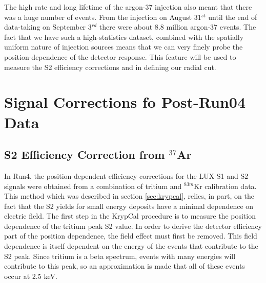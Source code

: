 The high rate and long lifetime of the argon-37 injection also meant that there was a huge number of events. From the injection on August 31$^{st}$ until the end of data-taking on September 3$^{rd}$ there were about 8.8 million argon-37 events. The fact that we have such a high-statistics dataset, combined with the spatially uniform nature of injection sources means that we can very finely probe the position-dependence of the detector response. This feature will be used to measure the S2 efficiency corrections and in defining our radial cut.


\section{Signal Corrections fo Post-Run04 Data}\label{sec:corrections}

\subsection{S2 Efficiency Correction from $^{37}$Ar}\label{sec:s2corr}
In Run4, the position-dependent efficiency corrections for the LUX S1 and S2 signals were obtained from a combination of tritium and $^{83m}$Kr calibration data. This method which was described in section \ref{sec:krypcal}, relies, in part, on the fact that the S2 yields for small energy deposits have a minimal dependence on electric field. The first step in the KrypCal procedure is to measure the position dependence of the tritium peak S2 value. In order to derive the detector efficiency part of the position dependence, the field effect must first be removed. This field dependence is itself dependent on the energy of the events that contribute to the S2 peak. Since tritium is a beta spectrum, events with many energies will contribute to this peak, so an approximation is made that all of these events occur at 2.5 keV.

